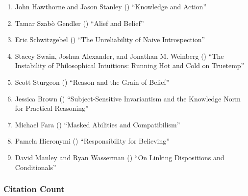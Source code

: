 \documentclass[
  10pt,
  letterpaper,
  DIV=11,
  numbers=noendperiod,
  twoside]{scrartcl}
\providecommand{\tightlist}{%
  \setlength{\itemsep}{0pt}\setlength{\parskip}{0pt}}\usepackage{longtable,booktabs,array}
\begin{document}
\begin{enumerate}
\def\labelenumi{\arabic{enumi}.}
\tightlist
\item
  John Hawthorne and Jason Stanley
  () ``Knowledge and Action''
\item
  Tamar Szabò Gendler () ``Alief
  and Belief''
\item
  Eric Schwitzgebel () ``The
  Unreliability of Naive Introspection''
\item
  Stacey Swain, Joshua Alexander, and Jonathan M. Weinberg
  () ``The Instability of
  Philosophical Intuitions: Running Hot and Cold on Truetemp''
\item
  Scott Sturgeon () ``Reason and
  the Grain of Belief''
\item
  Jessica Brown ()
  ``Subject-Sensitive Invariantism and the Knowledge Norm for Practical
  Reasoning''
\item
  Michael Fara () ``Masked
  Abilities and Compatibilism''
\item
  Pamela Hieronymi ()
  ``Responsibility for Believing''
\item
  David Manley and Ryan Wasserman
  () ``On Linking Dispositions
  and Conditionals''
\end{enumerate}

\subsubsection*{Citation Count}\label{sec-count-2008}
\end{document}
